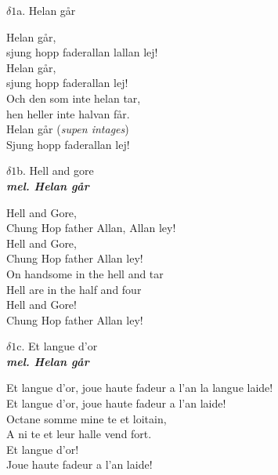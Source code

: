 \documentclass[a6paper,10pt]{article}
\newcommand{\mel}[1]{\small\textbf{\textit{mel. #1 \\}}}
\begin{document}
\setlength{\oddsidemargin}{-0.37in}
\noindent
\begin{center}
\Large $\delta1$a. Helan går \\ 
\end{center}
\small Helan går, \\
sjung hopp faderallan lallan lej! \\
Helan går, \\
sjung hopp faderallan lej! 
\vspace{5pt} \\
Och den som inte helan tar, \\
hen heller inte halvan får. \\
Helan går (\textit{supen intages})\\
Sjung hopp faderallan lej! 
\begin{center}
\Large $\delta1$b. Hell and gore \\ 
\mel{Helan går}
\end{center}
Hell and Gore, \\
Chung Hop father Allan, Allan ley! \\
Hell and Gore, \\
Chung Hop father Allan ley!
\vspace{5pt} \\
On handsome in the hell and tar \\
Hell are in the half and four \\
Hell and Gore! \\
Chung Hop father Allan ley! 
\begin{center}
\Large $\delta1$c. Et langue d'or\\ 
\mel{Helan går}
\end{center}
Et langue d'or, joue haute fadeur a l'an la langue laide! \\
Et langue d'or, joue haute fadeur a l'an laide! \\
Octane somme mine te et loitain, \\
A ni te et leur halle vend fort. \\
Et langue d'or! \\
Joue haute fadeur a l'an laide! 
\end{document}
